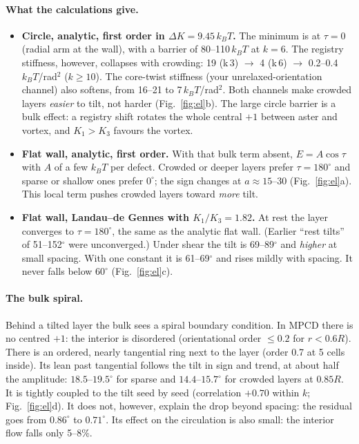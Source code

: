\documentclass[11pt,a4paper]{article}
\newcommand{\kT}{k_BT}
\begin{document}
\paragraph{What the calculations give.}
\begin{itemize}
\item \textbf{Circle, analytic, first order in $\Delta K=9.45\,\kT$.} The minimum is at $\tau=0$ (radial arm at the wall), with a barrier of 80--110\,$\kT$ at $k=6$. The registry stiffness, however, collapses with crowding: 19 (k\,3) $\to$ 4 (k\,6) $\to$ 0.2--0.4\,$\kT$/rad$^2$ ($k\ge10$). The core-twist stiffness (your unrelaxed-orientation channel) also softens, from 16--21 to 7\,$\kT$/rad$^2$. Both channels make crowded layers \emph{easier} to tilt, not harder (Fig.~\ref{fig:el}b). The large circle barrier is a bulk effect: a registry shift rotates the whole central $+1$ between aster and vortex, and $K_1>K_3$ favours the vortex.
\item \textbf{Flat wall, analytic, first order.} With that bulk term absent, $E=A\cos\tau$ with $A$ of a few $\kT$ per defect. Crowded or deeper layers prefer $\tau=180^\circ$ and sparse or shallow ones prefer $0^\circ$; the sign changes at $a\approx15$--30 (Fig.~\ref{fig:el}a). This local term pushes crowded layers toward \emph{more} tilt.
\item \textbf{Flat wall, Landau--de Gennes with $K_1/K_3=1.82$.} At rest the layer converges to $\tau=180^\circ$, the same as the analytic flat wall. (Earlier ``rest tilts'' of 51--152$^\circ$ were unconverged.) Under shear the tilt is 69--89$^\circ$ and \emph{higher} at small spacing. With one constant it is 61--69$^\circ$ and rises mildly with spacing. It never falls below $60^\circ$ (Fig.~\ref{fig:el}c).
\end{itemize}

\paragraph{The bulk spiral.} Behind a tilted layer the bulk sees a spiral boundary condition. In MPCD there is no centred $+1$: the interior is disordered (orientational order $\le0.2$ for $r<0.6R$). There is an ordered, nearly tangential ring next to the layer (order 0.7 at 5 cells inside). Its lean past tangential follows the tilt in sign and trend, at about half the amplitude: $18.5$--$19.5^\circ$ for sparse and $14.4$--$15.7^\circ$ for crowded layers at $0.85R$. It is tightly coupled to the tilt seed by seed (correlation $+0.70$ within $k$; Fig.~\ref{fig:el}d). It does not, however, explain the drop beyond spacing: the residual goes from $0.86^\circ$ to $0.71^\circ$. Its effect on the circulation is also small: the interior flow falls only 5--8\%.
\end{document}
